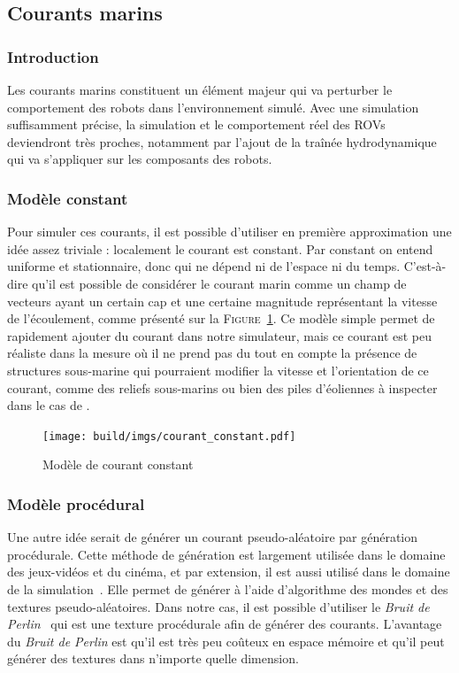 		\subsection{Courants marins}

			\subsubsection{Introduction}

				Les courants marins constituent un élément majeur qui va perturber le comportement des robots dans l'environnement simulé. Avec une simulation suffisamment précise, la simulation et le comportement réel des \gls{ROV}s deviendront très proches, notamment par l'ajout de la traînée hydrodynamique qui va s'appliquer sur les composants des robots.

			\subsubsection{Modèle constant}

				Pour simuler ces courants, il est possible d'utiliser en première approximation une idée assez triviale : localement le courant est constant. Par constant on entend uniforme et stationnaire, donc qui ne dépend ni de l'espace ni du temps. C’est-à-dire qu'il est possible de considérer le courant marin comme un champ de vecteurs ayant un certain cap et une certaine magnitude représentant la vitesse de l'écoulement, comme présenté sur la \textsc{Figure}~\ref{fig:constant}. Ce modèle simple permet de rapidement ajouter du courant dans notre simulateur, mais ce courant est peu réaliste dans la mesure où il ne prend pas du tout en compte la présence de structures sous-marine qui pourraient modifier la vitesse et l'orientation de ce courant, comme des reliefs sous-marins ou bien des piles d'éoliennes à inspecter dans le cas de \forssea{}.

				\begin{figure}[!htb]
					\centering
					\texttt{[image: build/imgs/courant\_constant.pdf]}
					\caption{Modèle de courant constant}
					\label{fig:constant}
				\end{figure}

			\subsubsection{Modèle procédural}

				Une autre idée serait de générer un courant pseudo-aléatoire par génération procédurale. Cette méthode de génération est largement utilisée dans le domaine des jeux-vidéos et du cinéma, et par extension, il est aussi utilisé dans le domaine de la simulation~\cite{generation_procedurale_monde, volumetric_terrain_generation}. Elle permet de générer à l'aide d'algorithme des mondes et des textures pseudo-aléatoires. Dans notre cas, il est possible d'utiliser le \textit{Bruit de Perlin}~\cite{PerlinNoise} qui est une texture procédurale afin de générer des courants. L'avantage du \textit{Bruit de Perlin} est qu'il est très peu coûteux en espace mémoire et qu'il peut générer des textures dans n'importe quelle dimension. 
				
